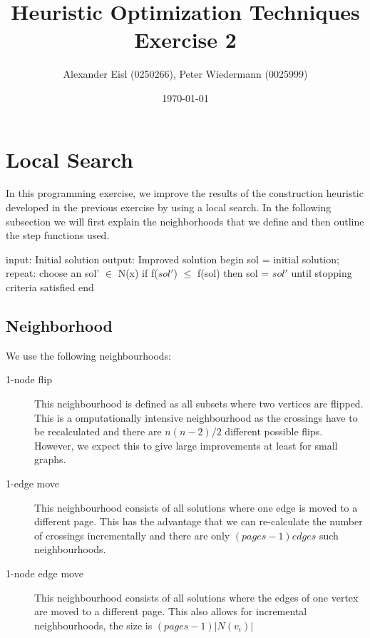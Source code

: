 \documentclass{scrartcl}
\author{Alexander Eisl (0250266), Peter Wiedermann (0025999)}
\date{\today}
\title{Heuristic Optimization Techniques \\ Exercise 2}
\begin{document}
\maketitle


\section{Local Search}
\label{sec:deterministic}
In this programming exercise, we improve the results of the construction
heuristic developed in the previous exercise by using a local search. In the following
subsection we will first explain the neighborhoods that we define and then outline the
step functions used.

\begin{algorithm}[caption={Local search}]
    input: Initial solution
    output: Improved solution
    begin
    	sol = initial solution;
	repeat:
		choose an sol' $\in$ N(x) 
		if f($sol'$) $\leq$ f(sol) then
			sol = $sol'$
	until stopping criteria satisfied
    end
\end{algorithm}

\subsection{Neighborhood}
We use the following neighbourhoods:

\begin{description}
\item[1-node flip] This neighbourhood is defined as all subsets where two vertices are flipped. This is a omputationally intensive neighbourhood as the crossings have to be recalculated and there are $n(n-2)/2$ different possible flips. However, we expect this to give large improvements at least for small graphs.
	
\item[1-edge move] This neighbourhood consists of all solutions where one edge is moved to a different
	page. This has the advantage that we can re-calculate the number of crossings incrementally and 			there	are only $(pages-1) edges$ such neighbourhoods. 
	
\item[1-node edge move] This neighbourhood consists of all solutions where the edges of
	one vertex are moved to a different page. This also allows for incremental neighbourhoods, the
		size is $(pages-1) |N(v_i)|$

\end{description}
\end{document}
